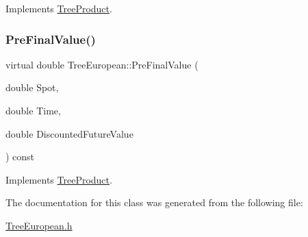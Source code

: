 Implements \hyperlink{classTreeProduct_acda7abc61cf6ac1b0f69a09eb0709832}{Tree\+Product}.

\hypertarget{classTreeEuropean_a555787d536320f1d9ce776da1c785058}{}\label{classTreeEuropean_a555787d536320f1d9ce776da1c785058} 
\subsubsection{\texorpdfstring{Pre\+Final\+Value()}{PreFinalValue()}}
{\footnotesize\ttfamily virtual double Tree\+European\+::\+Pre\+Final\+Value (\begin{DoxyParamCaption}\item[{double}]{Spot,  }\item[{double}]{Time,  }\item[{double}]{Discounted\+Future\+Value }\end{DoxyParamCaption}) const\hspace{0.3cm}{\ttfamily [virtual]}}



Implements \hyperlink{classTreeProduct_a0b58b8acdd3759f55212c1c65361056e}{Tree\+Product}.



The documentation for this class was generated from the following file\+:\begin{DoxyCompactItemize}
\item 
\hyperlink{TreeEuropean_8h}{Tree\+European.\+h}\end{DoxyCompactItemize}
